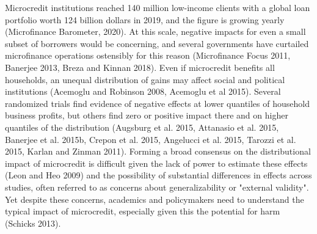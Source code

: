 \documentclass[english,12pt]{article}\usepackage{lmodern}
\numberwithin{equation}{section}
\begin{document}
Microcredit institutions reached 140 million low-income clients with a global loan portfolio worth 124 billion dollars in 2019, and the figure is growing yearly (Microfinance Barometer, 2020). At this scale, negative impacts for even a small subset of borrowers would be concerning, and several governments have curtailed microfinance operations ostensibly for this reason (Microfinance Focus 2011, Banerjee 2013, Breza and Kinnan 2018). Even if microcredit benefits all households, an unequal distribution of gains may affect social and political institutions (Acemoglu and Robinson 2008, Acemoglu et al 2015). Several randomized trials find evidence of negative effects at lower quantiles of household business profits, but others find zero or positive impact there and on higher quantiles of the distribution (Augsburg et al. 2015, Attanasio et al. 2015, Banerjee et al. 2015b, Crepon et al. 2015, Angelucci et al. 2015, Tarozzi et al. 2015, Karlan and Zinman 2011). Forming a broad consensus on the distributional impact of microcredit is difficult given the lack of power to estimate these effects (Leon and Heo 2009) and the possibility of substantial differences in effects across studies, often referred to as concerns about generalizability or "external validity". Yet despite these concerns, academics and policymakers need to understand the typical impact of microcredit, especially given this the potential for harm (Schicks 2013).
\end{document}

